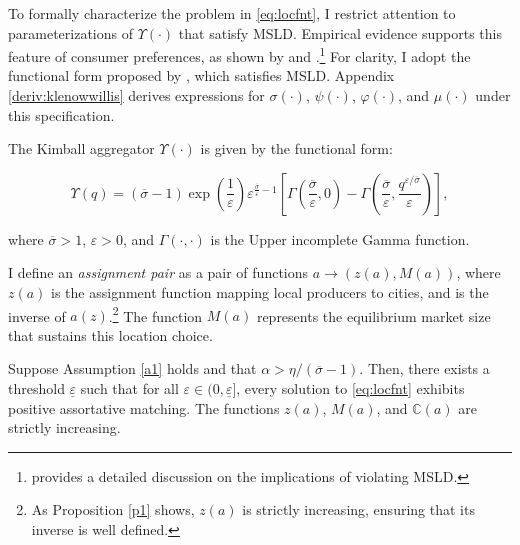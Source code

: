 To formally characterize the problem in \eqref{eq:locfnt}, I restrict attention to parameterizations of $\Upsilon(\cdot)$ that satisfy MSLD. Empirical evidence supports this feature of consumer preferences, as shown by \textcite{DeLoecker&Goldberg14} and \textcite{AmitiItskhoki&Konings19}.\footnote{\textcite{Melitz18} provides a detailed discussion on the implications of violating MSLD.}  For clarity, I adopt the functional form proposed by \textcite{Klenow&Willis16}, which satisfies MSLD. Appendix \ref{deriv:klenowwillis} derives expressions for $\sigma(\cdot)$, $\psi(\cdot)$, $\varphi(\cdot)$, and $\mu(\cdot)$ under this specification.

\begin{assum}\label{a1}
	The Kimball aggregator $\Upsilon(\cdot)$ is given by the \textcite{Klenow&Willis16} functional form:
	
	\begin{equation}\label{eq:fformkw}
		\Upsilon(q) = (\overline{\sigma} -1) \exp\left(\frac{1}{\varepsilon}\right) \varepsilon^{\frac{\overline{\sigma}}{\varepsilon} -1} \left[\Gamma\left(\frac{\overline{\sigma}}{\varepsilon},0 \right) - \Gamma \left(\frac{\overline{\sigma}}{\varepsilon}, \frac{q^{\varepsilon/\overline{\sigma}}}{\varepsilon} \right) \right],
	\end{equation}
	
	where $\overline{\sigma} > 1$, $\varepsilon > 0$, and $\Gamma(\cdot, \cdot)$ is the Upper incomplete Gamma function.
\end{assum}

I define an \textit{assignment pair} as a pair of functions $a \to (z(a), M(a))$, where $z(a)$ is the assignment function mapping local producers to cities, and is the inverse of $a(z)$.\footnote{As Proposition \ref{p1} shows, $z(a)$ is strictly increasing, ensuring that its inverse is well defined.} The function $M(a)$ represents the equilibrium market size that sustains this location choice.

\begin{prop}[Sorting]\label{p1}
	Suppose Assumption \ref{a1} holds and that $\alpha > \eta/(\overline{\sigma} -1)$. Then, there exists a threshold $\underline{\varepsilon}$ such that for all $\varepsilon \in (0, \underline{\varepsilon}]$, every solution to \eqref{eq:locfnt} exhibits positive assortative matching. The functions $z(a)$, $M(a)$, and $\mathbb{C}(a)$ are strictly increasing.
\end{prop}

